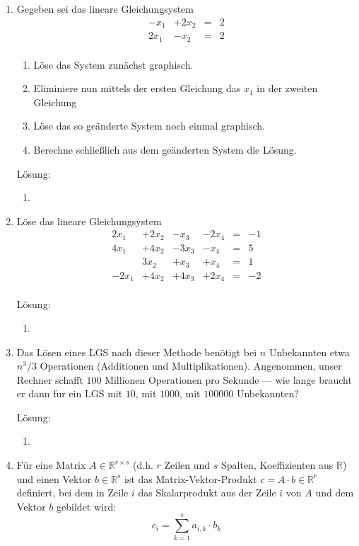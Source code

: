 \documentclass[main.tex]{subfiles}
\begin{document}
\begin{enumerate}
	\item Gegeben sei das lineare Gleichungsystem
	      \[ \begin{array}{cccc}
			      -x_1 & +2 x_2 & = & 2 \\
			      2x_1 & -x_2   & = & 2 \\
		      \end{array} \]
	      \begin{enumerate}
		      \item Löse das System zunächst graphisch.
		      \item Eliminiere nun mittels der ersten Gleichung das \( x_1 \)
		            in der zweiten Gleichung
		      \item Löse das so geänderte System noch einmal graphisch.
		      \item Berechne schließlich aus dem geänderten System die Lösung.
	      \end{enumerate}

	      Lösung:
	      \begin{enumerate}
		      \item
	      \end{enumerate}
	\item Löse das lineare Gleichungsystem
	      \[ \begin{array}{cccccc}
			      2x_1  & +2x_2 & -x_3  & -2x_4 & = & -1 \\
			      4x_1  & +4x_2 & -3x_3 & -x_4  & = & 5  \\
			            & 3x_2  & +x_3  & +x_4  & = & 1  \\
			      -2x_1 & +4x_2 & +4x_3 & +2x_4 & = & -2 \\
		      \end{array} \]

	      Lösung:
	      \begin{enumerate}
		      \item
	      \end{enumerate}
	\item Das Lösen eines LGS nach dieser Methode benötigt bei \( n \) Unbekannten etwa
	      \( n^3/3 \) Operationen (Additionen und Multiplikationen). Angenommen, unser
	      Rechner schafft \( 100 \) Millionen Operationen pro Sekunde — wie lange braucht
	      er dann fur ein LGS mit \( 10 \), mit \( 1000 \), mit \( 100000 \) Unbekannten?

	      Lösung:
	      \begin{enumerate}
		      \item
	      \end{enumerate}
	\item Für eine Matrix \( A \in \mathbb{R}^{ r \times s } \) (d.h. \( r \) Zeilen und \( s \)
	      Spalten, Koeffizienten aus
	      \( \mathbb{R} \)) und einen Vektor \( b \in \mathbb{R}^s \) ist das Matrix-Vektor-Produkt
	      \( c = A \cdot b \in \mathbb{R}^r \) definiert, bei dem in Zeile \( i \) das Skalarprodukt
	      aus der Zeile \( i \) von \( A \) und dem Vektor \( b \) gebildet wird:
	      \[ c_i = \sum_{ k = 1 }^{s} a_{i,k} \cdot b_k \]


\end{enumerate}
\end{document}

